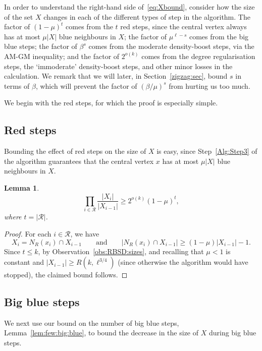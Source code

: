 \documentclass[12pt,reqno]{amsart}
\newtheorem{lemma}[theorem]{Lemma}
\theoremstyle{definition}
\theoremstyle{remark}
\renewcommand{\le}{\leqslant}
\renewcommand{\ge}{\geqslant}
\def\cR{\mathcal{R}}
\begin{document}
In order to understand the right-hand side of~\eqref{eq:Xbound}, consider how the size of the set $X$ changes in each of the different types of step in the algorithm. The factor of $(1 - \mu)^t$ comes from the $t$ red steps, since the central vertex always has at most $\mu |X|$ blue neighbours in $X$; the factor of $\mu^{\ell - s}$ comes from the big blue steps; the factor of  $\beta^s$ comes from the moderate density-boost steps, via the AM-GM inequality; and the factor of $2^{o(k)}$ comes from the degree regularisation steps, the `immoderate' density-boost steps, and other minor losses in the calculation. We remark that we will later, in Section~\ref{zigzag:sec}, bound $s$ in terms of $\beta$, which will prevent the factor of $(\beta/\mu)^s$ from hurting us too much.

We begin with the red steps, for which the proof is especially simple. 

\subsection{Red steps}

Bounding the effect of red steps on the size of $X$ is easy, since Step~\ref{Alg:Step3} of the algorithm guarantees that the central vertex $x$ has at most $\mu |X|$ blue neighbours in $X$. 

\begin{lemma}\label{lem:red:total:decrease}
$$\prod_{i \in \cR} \frac{|X_i|}{|X_{i-1}|} \ge 2^{o(k)} (1 - \mu)^t,$$
where $t = |\cR|$. 
\end{lemma}

\begin{proof}%
For each $i \in \cR$, we have 
$$X_i = N_R(x_i) \cap X_{i-1} \qquad \text{and} \qquad |N_R(x_i) \cap X_{i-1}| \ge (1 - \mu) |X_{i-1}| - 1.$$
Since $t \le k$, by Observation~\ref{obs:RBSD:sizes}, and recalling that $\mu < 1$ is constant and $|X_{i-1}| \ge R(k,\ell^{3/4})$ (since otherwise the algorithm would have stopped), the claimed bound follows. 
\end{proof}


\subsection{Big blue steps}

We next use our bound on the number of big blue steps, Lemma~\ref{lem:few:big:blue}, to bound the decrease in the size of $X$ during big blue steps.
\end{document}
